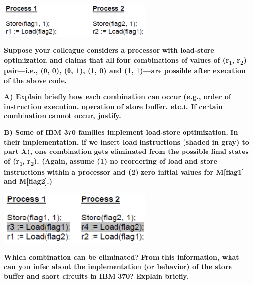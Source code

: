 \documentclass{article}
\begin{document}
    {\centering
        \includegraphics[width=3in]{csci-8150/final-exam-1/images/arch_final_3.png}\par 
    }

\textbf{Suppose your colleague considers a processor with load-store optimization and claims that all four combinations of values of (r\textsubscript{1}, r\textsubscript{2}) pair—i.e., (0, 0), (0, 1), (1, 0) and (1, 1)—are possible after execution of the above code.}

\textbf{A) Explain briefly how each combination can occur (e.g., order of instruction execution, operation of store buffer, etc.). If certain combination cannot occur, justify.}

\textbf{B) Some of IBM 370 families implement load-store optimization. In their implementation, if we insert load instructions (shaded in gray) to part A), one combination gets eliminated from the possible final states of (r\textsubscript{1}, r\textsubscript{2}). (Again, assume (1) no reordering of load and store instructions within a processor and (2) zero initial values for M[flag1] and M[flag2].)}

    {\centering
        \includegraphics[width=3in]{csci-8150/final-exam-1/images/arch_final_3_2.png}\par 
    }

\textbf{Which combination can be eliminated? From this information, what can you infer about the implementation (or behavior) of the store buffer and short circuits in IBM 370? Explain briefly.}
\end{document}
